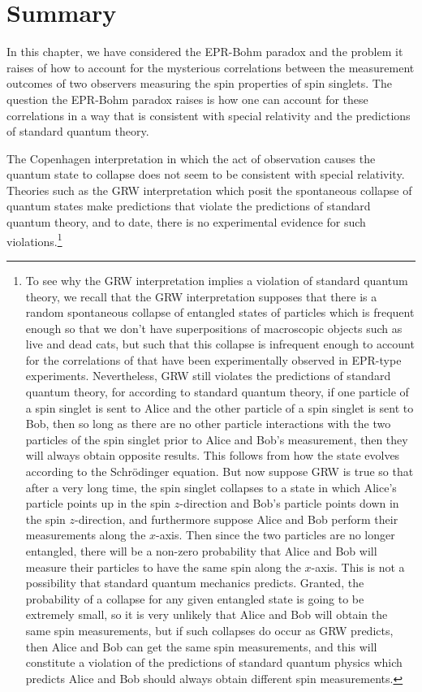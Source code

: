 
\section{Summary}
In this chapter, we have considered the EPR-Bohm paradox and the problem it raises of how to account for the mysterious correlations between the measurement outcomes of two observers measuring the spin properties of spin singlets. The question the EPR-Bohm paradox raises is how one can  account for these correlations in a way that is consistent with special relativity and the predictions of standard quantum theory.

The Copenhagen interpretation in which the act of observation causes the quantum state to collapse does not seem to be consistent with special relativity. Theories such as the GRW interpretation which posit the spontaneous collapse of quantum states make predictions that violate the predictions of standard quantum theory, and to date, there is no experimental evidence for such violations.\footnote{To see why the GRW interpretation implies a violation of standard quantum theory, we recall that the GRW interpretation supposes that there is a random spontaneous collapse of entangled states of particles which is frequent enough so that we don't have superpositions of macroscopic objects such as live and dead cats, but such that this collapse is infrequent enough to account for the correlations of that have been experimentally observed in EPR-type experiments. Nevertheless, GRW still violates the predictions of standard quantum theory, for according to standard quantum theory, if one particle of a spin singlet is sent to Alice and the other particle of a spin singlet is sent to Bob, then so long as there are no other particle interactions with the two particles of the spin singlet prior to Alice and Bob's measurement, then they will always obtain opposite results. This follows from how the state evolves according to the Schr\"{o}dinger equation. But now suppose GRW is true so that after a very long time, the spin singlet collapses to a state in which Alice's particle points up in the spin $z$-direction and Bob's particle points down in the spin $z$-direction, and furthermore suppose Alice and Bob perform their measurements along the $x$-axis. Then since the two particles are no longer entangled,  there will be a non-zero probability that Alice and Bob will measure their particles to have the same spin along the $x$-axis. This is not a possibility that standard quantum mechanics predicts. Granted, the probability of a collapse for any given entangled state is going to be extremely small, so it is very unlikely that Alice and Bob will obtain the same spin measurements, but if such collapses do occur as GRW predicts, then Alice and Bob can get the same spin measurements, and this will constitute a violation of the predictions of standard quantum physics which predicts Alice and Bob should always obtain different spin measurements.} 

